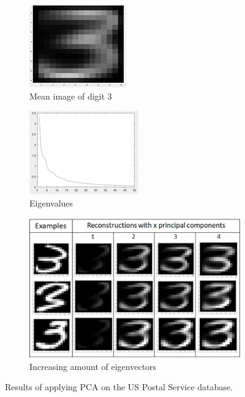\documentclass[a4paper,10pt]{article}
\begin{document}
\begin{figure}[h!]
	\centering
	\begin{subfigure}[b]{0.49\textwidth}
		\centering
		\includegraphics[width=0.55\linewidth]{mean_three.png}
		\caption{Mean image of digit 3}
		\label{fig:mean_three}
	\end{subfigure}
	\begin{subfigure}[b]{0.49\textwidth}
		\centering
		\includegraphics[width=0.6\linewidth]{50_largest_eigenvalues.png}
		\caption{Eigenvalues}
		\label{fig:50_largest_eigenvalues}
	\end{subfigure}
	\begin{subfigure}[b]{1.0\textwidth}
		\centering
		\includegraphics[width=0.4\linewidth]{reconstruction_x_principal_eigenvalues.png}
		\caption{Increasing amount of eigenvectors}
		\label{fig:increasing_eigenvectors}
	\end{subfigure}		
	\caption{Results of applying PCA on the US Postal Service database.}
	\label{fig:Results1}
\end{figure}
\end{document}
